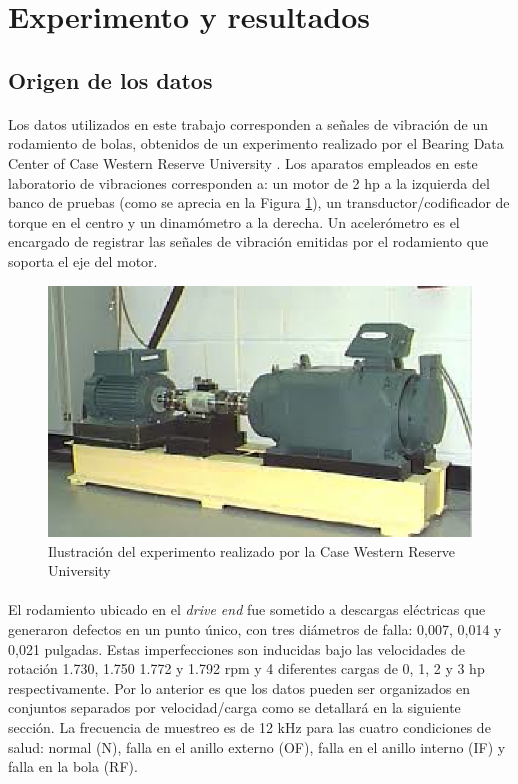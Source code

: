 \documentclass[12pt]{article}%
\begin{document}
\section{Experimento y resultados}
\subsection{Origen de los datos}
\paragraph{}
Los datos utilizados en este trabajo corresponden a señales de vibración de un rodamiento de bolas, obtenidos de un experimento realizado por el Bearing Data Center of Case Western Reserve University \cite{case}. Los aparatos empleados en este laboratorio de vibraciones corresponden a: un motor de 2 hp a la izquierda del banco de pruebas (como se aprecia en la Figura \ref{fig:bearing}), un transductor/codificador de torque en el centro y un dinamómetro a la derecha. Un acelerómetro es el encargado de registrar las señales de vibración emitidas por el rodamiento que soporta el eje del motor.

\begin{figure}[ht]
  \centering
    \includegraphics[scale=0.8]{./bearing.eps}
  \caption{Ilustración del experimento realizado por la Case Western Reserve University \cite{case}}
  \label{fig:bearing}
\end{figure}

\paragraph{}
El rodamiento ubicado en el \textit{drive end} fue sometido a descargas eléctricas que generaron defectos en un  punto único, con tres diámetros de falla: 0,007, 0,014 y 0,021 pulgadas. Estas imperfecciones son inducidas bajo las velocidades de rotación 1.730, 1.750 1.772 y 1.792 rpm y 4 diferentes cargas de 0, 1, 2 y 3 hp respectivamente. Por lo anterior es que los datos pueden ser organizados en conjuntos separados por velocidad/carga como se detallará en la siguiente sección. La frecuencia de muestreo es de 12 kHz para las cuatro condiciones de salud: normal (N), falla en el anillo externo (OF), falla en el anillo interno (IF) y falla en la bola (RF). 
\end{document}
